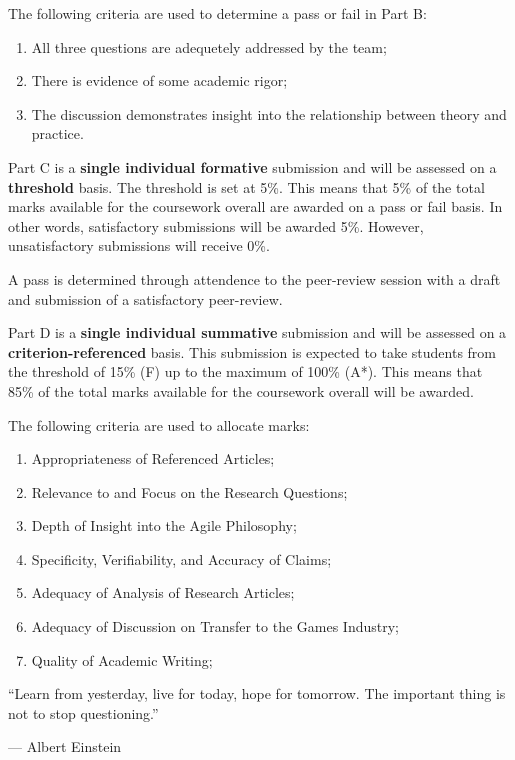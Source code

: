 \documentclass{../fal_assignment}
\begin{document}
The following criteria are used to determine a pass or fail in Part B:

\begin{enumerate}[label=(\alph*)]
	\item All three questions are adequetely addressed by the team;
	\item There is evidence of some academic rigor;
	\item The discussion demonstrates insight into the relationship between theory and practice.
\end{enumerate}

Part C is a \textbf{single individual formative} submission and will be assessed on a \textbf{threshold} basis. The threshold is set at 5\%. This means that 5\% of the total marks available for the coursework overall are awarded on a pass or fail basis. In other words, satisfactory submissions will be awarded 5\%. However, unsatisfactory submissions will receive 0\%.

A pass is determined through attendence to the peer-review session with a draft and submission of a satisfactory peer-review.

Part D is a \textbf{single individual summative} submission and will be assessed on a \textbf{criterion-referenced} basis. This submission is expected to take students from the threshold of 15\% (F) up to the maximum of 100\% (A*). This means that 85\% of the total marks available for the coursework overall will be awarded.

The following criteria are used to allocate marks:

\begin{enumerate}[label=(\alph*)]
	\item Appropriateness of Referenced Articles;
	\item Relevance to and Focus on the Research Questions;
	\item Depth of Insight into the Agile Philosophy;
	\item Specificity, Verifiability, and Accuracy of Claims;
	\item Adequacy of Analysis of Research Articles;	
	\item Adequacy of Discussion on Transfer to the Games Industry;
	\item Quality of Academic Writing;
\end{enumerate}

\begin{marginquote}
    ``Learn from yesterday, live for today, hope for tomorrow. The important thing is not to stop questioning.''
    
    --- Albert Einstein
\end{marginquote}
\end{document}

